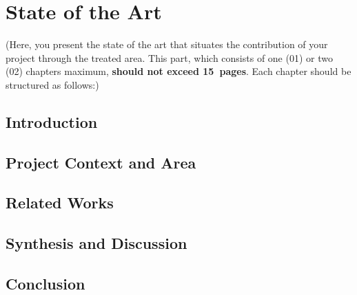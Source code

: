 \chapter{State of the Art} \label{chap:state_of_the_art}

(Here, you present the state of the art that situates the contribution of your project through the treated area. This part, which consists of one (01) or two (02) chapters maximum, \textbf{should not exceed 15~pages}. Each chapter should be structured as follows:)

\section*{Introduction}
\section{Project Context and Area}
\section{Related Works}
\section{Synthesis and Discussion}
\section*{Conclusion}
